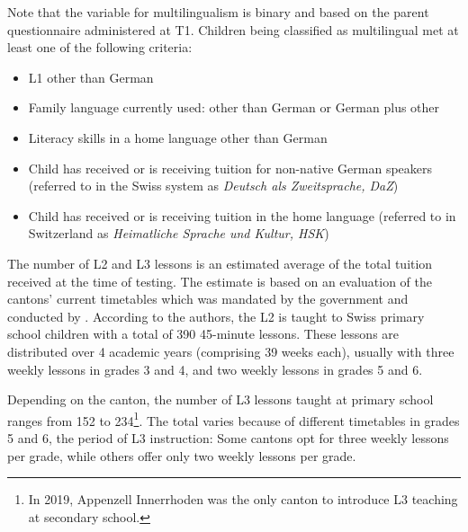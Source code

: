 \documentclass[output=paper]{langsci/langscibook}
\begin{document}
Note that the variable for multilingualism is binary and based on the parent questionnaire administered at T1. Children being classified as multilingual met at least one of the following criteria:

\begin{itemize}
\item L1 other than German
\item Family language currently used: other than German or German plus other
\item Literacy skills in a home language other than German
\item Child has received or is receiving tuition for non-native German speakers (referred to in the Swiss system as \textit{Deutsch als Zweitsprache, DaZ})
\item Child has received or is receiving tuition in the home language (referred to in Switzerland as \textit{Heimatliche Sprache und Kultur, HSK})
\end{itemize}

The number of L2 and L3 lessons is an estimated average of the total tuition received at the time of testing. The estimate is based on an evaluation of the cantons’ current timetables which was mandated by the government and conducted by \citet{BucherZemp2019}. According to the authors, the L2 is taught to Swiss primary school children with a total of 390 45-minute lessons. These lessons are distributed over 4 academic years (comprising 39 weeks each), usually with three weekly lessons in grades 3 and 4, and two weekly lessons in grades 5 and 6.

Depending on the canton, the number of L3 lessons taught at primary school ranges from 152 to 234\footnote{In 2019, Appenzell Innerrhoden was the only canton to introduce L3 teaching at secondary school.}. The total varies because of different timetables in grades 5 and 6, the period of L3 instruction: Some cantons opt for three weekly lessons per grade, while others offer only two weekly lessons per grade. 


\begin{table}
\caption{Participants LAPS I\label{tab:02:2}}
\end{table}
\end{document}
